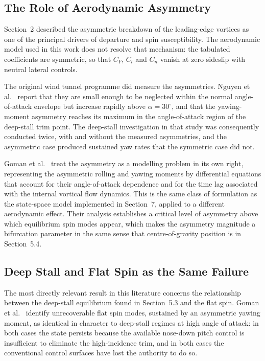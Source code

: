 \documentclass[
bindingoffset=5mm,  %
footnoteindent=3mm, %
hyphenation=true    %
]{src/wut-thesis}
\begin{document}
 \subsection{The Role of Aerodynamic Asymmetry}
 
 Section~2 described the asymmetric breakdown of the leading-edge vortices as
 one of the principal drivers of departure and spin susceptibility. The
 aerodynamic model used in this work does not resolve that mechanism: the
 tabulated coefficients are symmetric, so that $C_{Y}$, $C_{l}$ and $C_{n}$
 vanish at zero sideslip with neutral lateral controls.
 
 The original wind tunnel programme did measure the asymmetries. Nguyen et
 al.~\cite{nguyen1979} report that they are small enough to be neglected within
 the normal angle-of-attack envelope but increase rapidly above
 $\alpha = 30^{\circ}$, and that the yawing-moment asymmetry reaches its maximum
 in the angle-of-attack region of the deep-stall trim point. The deep-stall
 investigation in that study was consequently conducted twice, with and without
 the measured asymmetries, and the asymmetric case produced sustained yaw rates
 that the symmetric case did not.
 
 Goman et al.~\cite{goman2003} treat the asymmetry as a modelling problem in
 its own right, representing the asymmetric rolling and yawing moments by
 differential equations that account for their angle-of-attack dependence and
 for the time lag associated with the internal vortical flow dynamics. This is
 the same class of formulation as the state-space model implemented in
 Section~7, applied to a different aerodynamic effect. Their analysis
 establishes a critical level of asymmetry above which equilibrium spin modes
 appear, which makes the asymmetry magnitude a bifurcation parameter in the
 same sense that centre-of-gravity position is in Section~5.4.
 
 \subsection{Deep Stall and Flat Spin as the Same Failure}
 
 The most directly relevant result in this literature concerns the relationship
 between the deep-stall equilibrium found in Section~5.3 and the flat spin.
 Goman et al.~\cite{goman2003} identify unrecoverable flat spin modes, sustained
 by an asymmetric yawing moment, as identical in character to deep-stall
 regimes at high angle of attack: in both cases the state persists because the
 available nose-down pitch control is insufficient to eliminate the
 high-incidence trim, and in both cases the conventional control surfaces have
 lost the authority to do so.
 
\end{document}
